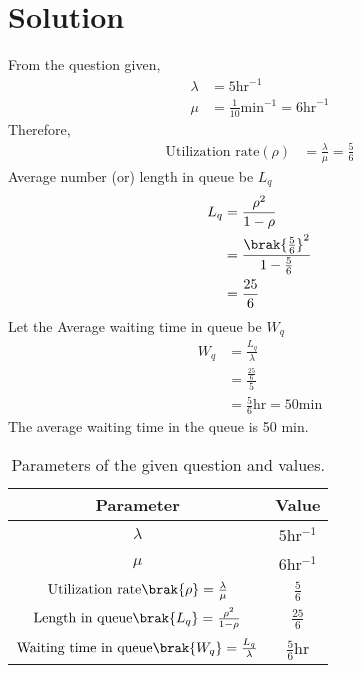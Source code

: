 \section{Solution}
From the question given,
\begin{align}
    \lambda &=5\text{hr}^{-1}\\
    \mu&=\frac{1}{10}\text{min}^{-1} =6\text{hr}^{-1}
    \end{align}
Therefore,
\begin{align}
    \text{Utilization rate}(\rho)&=\frac{\lambda}{\mu}=\frac{5}{6}
    \end{align}
Average number (or) length in queue be $L_q$
    \begin{align}
    L_q&=\frac{\rho^2}{1-\rho}\\
    &=\frac{\brak{\frac{5}{6}}^2}{1-\frac{5}{6}}\\
    &=\frac{25}{6}
    \end{align}
Let the Average waiting time in queue be $W_q$
    \begin{align}
    W_q&=\frac{L_q}{\lambda}\\
    &=\frac{\frac{25}{6}}{5}\\
    &=\frac{5}{6}\text{hr}=50\text{min}
\end{align}
The average waiting time in the queue is 50 min.
\newpage
\begin{table}[h!]
\centering
\resizebox{\columnwidth}{!}
{
    \begin{tabular}{|c|c|}
    \hline
    Parameter & Value \\
    \hline
    $\lambda$ & $5$hr$^{-1}$\\
    \hline
    $\mu$ & $6$hr$^{-1}$\\
    \hline
    $\text{Utilization rate}\brak{\rho}=\frac{\lambda}{\mu}$ & $\frac{5}{6}$\\[1ex]
    \hline
    $\text{Length in queue}\brak{L_q}=\frac{\rho^2}{1-\rho}$ & $\frac{25}{6}$\\[1ex]
    \hline
    $\text{Waiting time in queue}\brak{W_q}=\frac{L_q}{\lambda}$ & $\frac{5}{6}$hr\\[1ex]
    \hline     
    \end{tabular}
}
    \caption{Parameters of the given question and values.}
    \label{me2011-19:TABLE-1}
\end{table}